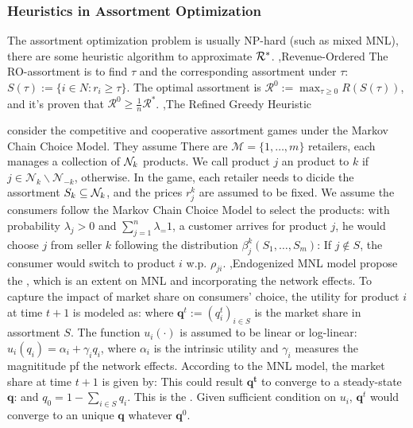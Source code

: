 \documentclass[10pt]{report}
\begin{document}
\subsubsection{Heuristics in Assortment Optimization}
The assortment optimization problem is usually NP-hard (such as mixed MNL), there are some heuristic algorithm to approximate $\mathcal{R}^*$.
\sep{Revenue-Ordered}
The RO-assortment is to find $\tau$ and the corresponding assortment under $\tau$: $S(\tau):=\{i\in N:r_i\geq\tau\}.$ The optimal assortment is 
$\mathcal{R}^0:=\max_{\tau\geq0}R(S(\tau))$, and it's proven that $\mathcal{R}^0\geq\frac1n\mathcal{R}^*$.
\sep{The Refined Greedy Heuristic}

\cite{NiP2021} consider the competitive and cooperative assortment games under the Markov Chain Choice Model. They assume There are $\mathcal{M}=\{1,\ldots,m\}$ retailers, each manages a
collection of $\mathcal{N}_k$ products. We call product $j$ an  product to $k$ if $j\in\mathcal{N}_{k}\backslash\mathcal{N}_{-k}$,  otherwise. In the game, each retailer needs to dicide
the assortment $S_k \subseteq \mathcal{N}_k$, and the prices $r_j^k$ are assumed to be fixed. We assume the consumers follow the Markov Chain Choice Model to select the products: with probability $\lambda_j>0$ and $\sum_{j=1}^n \lambda_=1$, a customer
arrives for product $j$, he would choose $j$ from seller $k$ following the distribution $\beta_j^k(S_1,\ldots,S_m)$:
If $j\notin S$, the consumer would switch to product $i$ w.p. $\rho_{ji}$.
\sep{Endogenized MNL model}
\cite{Wang2017} propose the , which is an extent on MNL and incorporating the network effects.
To capture the impact of market share on consumers’ choice, the utility for product $i$ at time $t+1$ is modeled as:
where $\mathbf{q}^t:=(q_i^t)_{i\in S}$ is the market share in assortment $S$. The function $u_i(\cdot)$ is assumed to be linear or log-linear:
$u_{i}(q_{i})=\alpha_{i}+\gamma_{i}q_{i}$, where $\alpha_i$ is the intrinsic utility and $\gamma_i$ measures the magnititude pf the network effects.
According to the MNL model, the market share at time $t+1$ is given by:
This could result $\mathbf{q^t}$ to converge to a steady-state $\mathbf{q}$:
and $q_0=1-\sum_{i\in S}q_i$. This is the . Given sufficient condition on $u_i$, $\mathbf{q}^t$ would converge to an unique $\mathbf{q}$
whatever $\mathbf{q}^0$.
\end{document}
